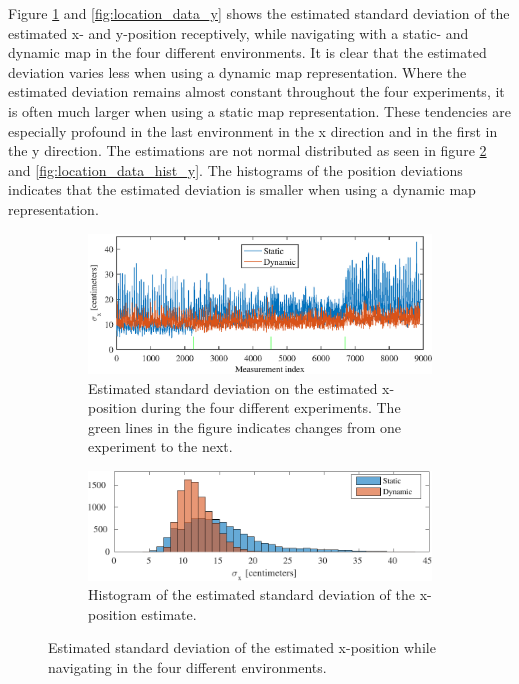 Figure \ref{fig:location_data_x} and \ref{fig:location_data_y} shows the estimated standard deviation of the estimated x- and y-position receptively, while navigating with a static- and dynamic map in the four different environments. 
It is clear that the estimated deviation varies less when using a dynamic map representation.
Where the estimated deviation remains almost constant throughout the four experiments, it is often much larger when using a static map representation. 
These tendencies are especially profound in the last environment in the x direction and in the first in the y direction. 
The estimations are not normal distributed as seen in figure \ref{fig:location_data_hist_x} and \ref{fig:location_data_hist_y}.
The histograms of the position deviations indicates that the estimated deviation is smaller when using a dynamic map representation.
\begin{figure}[htbp]
	\begin{subfigure}[t]{1\textwidth}	
		\centering	
		\includegraphics[scale=1.0]{chapters/evaluation/figures/location_data_x}	
		\caption{Estimated standard deviation on the estimated x-position during the four different experiments. The green lines in the figure indicates changes from one experiment to the next.}
		\label{fig:location_data_x}
	\end{subfigure}
	
	\begin{subfigure}[t]{1\textwidth}
		\centering
		\includegraphics[scale=1.0]{chapters/evaluation/figures/location_data_hist_x-crop}
		\caption{Histogram of the estimated standard deviation of the x-position estimate.}
		\label{fig:location_data_hist_x}
	\end{subfigure}
	\caption{Estimated standard deviation of the estimated x-position while navigating in the four different environments.}
	\label{fig:location_x_evaluation}
\end{figure}

